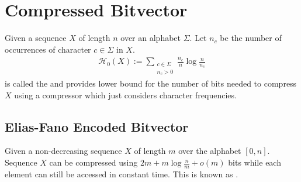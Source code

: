 \section{Compressed Bitvector}

\begin{Definition}
  \label{def:zerothOrderEntropy}
  Given a sequence $X$ of length $n$ over an alphabet $\Sigma$. Let $n_c$ be the number of occurrences of character $c \in \Sigma$ in $X$.
  \begin{align}
    \mathcal{H}_0(X) := \sum\limits_{\substack{c \in \Sigma\\ n_c > 0}} \frac{n_c}{n}\log\frac{n}{n_c}
  \end{align}
  is called the  and provides lower bound for the number of bits needed to compress $X$ using a compressor which just considers character frequencies.
\end{Definition}

\subsection{Elias-Fano Encoded Bitvector}

\begin{Theorem}
  \label{thm:eliasFanoEncoding}
  Given a non-decreasing sequence $X$ of length $m$ over the alphabet $[0,n]$. Sequence $X$ can be compressed using $2m + m\log\frac{n}{m} + o(m)$ bits while each element can still be accessed in constant time. This is known as .
\end{Theorem}

